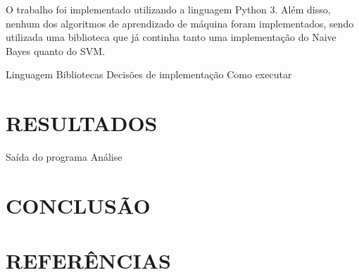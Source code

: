 \documentclass[12pt]{article}
\begin{document}
O trabalho foi implementado utilizando a linguagem Python 3. Além disso, nenhum
dos algoritmos de aprendizado de máquina foram implementados, sendo utilizada
uma biblioteca que já continha tanto uma implementação do Naive Bayes quanto do
SVM. 

Linguagem
Bibliotecas
Decisões de implementação
Como executar

\section{RESULTADOS}

Saída do programa
Análise

\section{CONCLUSÃO}



\section{REFERÊNCIAS}



\end{document}
